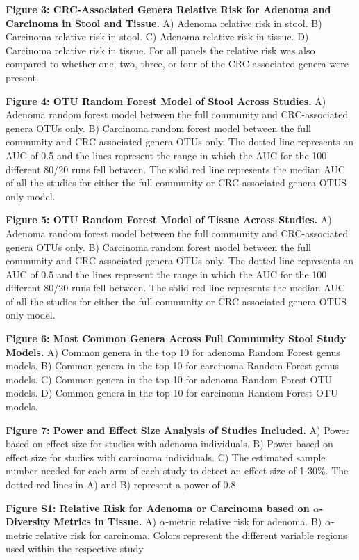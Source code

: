 \documentclass[12pt,]{article}
\begin{document}
\textbf{Figure 3: CRC-Associated Genera Relative Risk for Adenoma and
Carcinoma in Stool and Tissue.} A) Adenoma relative risk in stool. B)
Carcinoma relative risk in stool. C) Adenoma relative risk in tissue. D)
Carcinoma relative risk in tissue. For all panels the relative risk was
also compared to whether one, two, three, or four of the CRC-associated
genera were present.

\textbf{Figure 4: OTU Random Forest Model of Stool Across Studies.} A)
Adenoma random forest model between the full community and
CRC-associated genera OTUs only. B) Carcinoma random forest model
between the full community and CRC-associated genera OTUs only. The
dotted line represents an AUC of 0.5 and the lines represent the range
in which the AUC for the 100 different 80/20 runs fell between. The
solid red line represents the median AUC of all the studies for either
the full community or CRC-associated genera OTUS only model.

\textbf{Figure 5: OTU Random Forest Model of Tissue Across Studies.} A)
Adenoma random forest model between the full community and
CRC-associated genera OTUs only. B) Carcinoma random forest model
between the full community and CRC-associated genera OTUs only. The
dotted line represents an AUC of 0.5 and the lines represent the range
in which the AUC for the 100 different 80/20 runs fell between. The
solid red line represents the median AUC of all the studies for either
the full community or CRC-associated genera OTUS only model.

\textbf{Figure 6: Most Common Genera Across Full Community Stool Study
Models.} A) Common genera in the top 10 for adenoma Random Forest genus
models. B) Common genera in the top 10 for carcinoma Random Forest genus
models. C) Common genera in the top 10 for adenoma Random Forest OTU
models. D) Common genera in the top 10 for carcinoma Random Forest OTU
models.

\textbf{Figure 7: Power and Effect Size Analysis of Studies Included.}
A) Power based on effect size for studies with adenoma individuals. B)
Power based on effect size for studies with carcinoma individuals. C)
The estimated sample number needed for each arm of each study to detect
an effect size of 1-30\%. The dotted red lines in A) and B) represent a
power of 0.8.

\newpage

\textbf{Figure S1: Relative Risk for Adenoma or Carcinoma based on
\(\alpha\)-Diversity Metrics in Tissue.} A) \(\alpha\)-metric relative
risk for adenoma. B) \(\alpha\)-metric relative risk for carcinoma.
Colors represent the different variable regions used within the
respective study.
\end{document}
